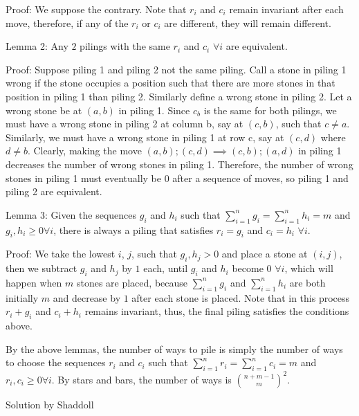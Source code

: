 \begin{enumerate}
 Proof: We suppose the contrary. Note that $r_i$ and $c_i$ remain invariant after each move, therefore, if any of the $r_i$ or $c_i$ are different, they will remain different.

 Lemma 2: Any $2$ pilings with the same $r_i$ and $c_i$ $\forall i$ are equivalent.

 Proof: Suppose piling 1 and piling 2 not the same piling. Call a stone in piling 1 wrong if the stone occupies a position such that there are more stones in that position in piling 1 than piling 2. Similarly define a wrong stone in piling 2. Let a wrong stone be at $(a, b)$ in piling 1. Since $c_b$ is the same for both pilings, we must have a wrong stone in piling 2 at column b, say at $(c, b)$, such that $c\not = a$. Similarly, we must have a wrong stone in piling 1 at row c, say at $(c, d)$ where $d \not = b$. Clearly, making the move $(a,b);(c,d) \implies (c,b);(a,d)$ in piling 1 decreases the number of wrong stones in piling 1. Therefore, the number of wrong stones in piling 1 must eventually be $0$ after a sequence of moves, so piling 1 and piling 2 are equivalent.

 Lemma 3: Given the sequences $g_i$ and $h_i$ such that $\sum_{i=1}^n g_i=\sum_{i=1}^n h_i=m$ and $g_i, h_i\geq 0 \forall i$, there is always a piling that satisfies $r_i=g_i$ and $c_i=h_i$ $\forall i$.

 Proof: We take the lowest $i$, $j$, such that $g_i, h_j >0$ and place a stone at $(i, j)$, then we subtract $g_i$ and $h_j$ by $1$ each, until $g_i$ and $h_i$ become $0$ $\forall i$, which will happen when $m$ stones are placed, because $\sum_{i=1}^n g_i$ and $\sum_{i=1}^n h_i$ are both initially $m$ and decrease by $1$ after each stone is placed. Note that in this process $r_i+g_i$ and $c_i+h_i$ remains invariant, thus, the final piling satisfies the conditions above.

 By the above lemmas, the number of ways to pile is simply the number of ways to choose the sequences $r_i$ and $c_i$ such that $\sum_{i=1}^n r_i=\sum_{i=1}^n c_i=m$ and $r_i, c_i \geq 0 \forall i$. By stars and bars, the number of ways is $\binom{n+m-1}{m}^{2}$.

 Solution by Shaddoll

 


\end{enumerate}